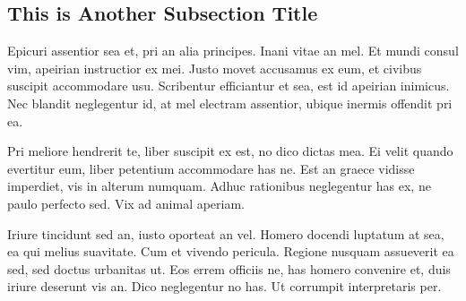 \subsection{This is Another Subsection Title}

Epicuri assentior sea et, pri an alia principes. Inani vitae an mel. Et mundi
consul vim, apeirian instructior ex mei. Justo movet accusamus ex eum, et
civibus suscipit accommodare usu. Scribentur efficiantur et sea, est id
apeirian inimicus. Nec blandit neglegentur id, at mel electram assentior,
ubique inermis offendit pri ea.

Pri meliore hendrerit te, liber suscipit ex est, no dico dictas mea. Ei velit
quando evertitur eum, liber petentium accommodare has ne. Est an graece vidisse
imperdiet, vis in alterum numquam. Adhuc rationibus neglegentur has ex, ne
paulo perfecto sed. Vix ad animal aperiam.

Iriure tincidunt sed an, iusto oporteat an vel. Homero docendi luptatum at sea,
ea qui melius suavitate. Cum et vivendo pericula. Regione nusquam assueverit ea
sed, sed doctus urbanitas ut. Eos errem officiis ne, has homero convenire et,
duis iriure deserunt vis an. Dico neglegentur no has. Ut corrumpit
interpretaris per.

